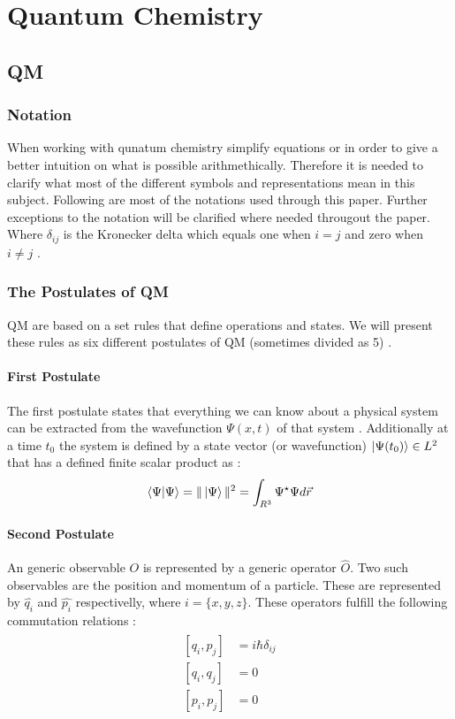 \documentclass[../master_thesis.tex]{subfiles}
\begin{document}
\chapter{Quantum Chemistry}
\section{\ac{QM}}
\subsection{Notation}
When working with qunatum chemistry simplify equations or in order to give a
better intuition on what is possible arithmethically. Therefore it is needed to
clarify what most of the different symbols and representations mean in this
subject. Following are most of the notations used through this paper. Further exceptions to the notation will be
clarified where needed througout the paper.
Where $\delta_{ij}$ is the Kronecker delta which equals one when $i = j$ and
zero when $ i \neq j$ \cite{ Atkins:2014, Atkins:2011, Cohen:1973, Cramer:2004, Jensen:2017}.
\subsection{The Postulates of \ac{QM}}

\ac{QM} are based on a set rules that define operations and states. We will
present these rules as six different postulates of \ac{QM} (sometimes divided
as 5) \cite{Atkins:2011, Cohen:1973}.

\subsubsection{First Postulate}
The first postulate states that everything we can know about a physical system
can be extracted from the wavefunction $\Psi(x, t)$ of that system
\cite{Atkins:2011}. Additionally at a time $t_0$ the system is defined by
a state vector (or wavefunction) $\ket{\Psi(t_0)}\in L^2$ that has a defined
finite scalar product as \cite{Cohen:1973}:
\begin{equation}
  \braket{\Psi|\Psi} = \|\ket{\Psi}\|^2 =  \int_{R^3}\Psi^\star\Psi d\vec{r}
\end{equation}

\subsubsection{Second Postulate}
An generic observable $O$ is represented by a generic operator $\hat{O}$. Two
such observables are the position and momentum of a particle. These are
represented by $\hat{q_i}$ and $\hat{p_i}$ respectivelly, where
$i = \{x, y, z\}$. These operators fulfill the following commutation relations
\cite{Atkins:2011, Cohen:1973}:
\begin{align}
  \begin{split}
    [q_i, p_j] &= i \hbar \delta_{ij}\\
    [q_i, q_j] &= 0 \\
    [p_i, p_j] &= 0
  \end{split}
\end{align}
\end{document}
